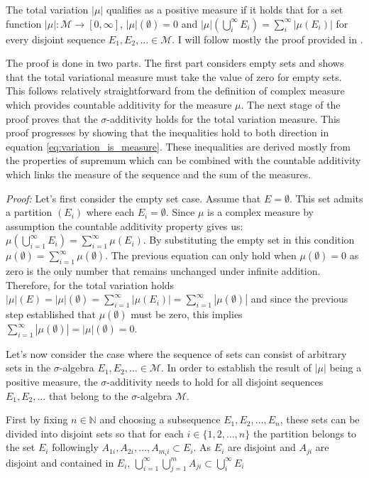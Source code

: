 \documentclass[12pt]{artikel1}
\begin{document}
The total variation $|\mu|$ qualifies as a positive measure if it holds that for a set function $|\mu|:\mathcal{M}\rightarrow[0,\infty]$, $|\mu|(\emptyset)=0$ and $|\mu|\left(\bigcup_i^\infty E_i\right)=\sum_i^\infty|\mu(E_i)|$ for every disjoint sequence $E_1,E_2,\ldots\in\mathcal{M}$. I will follow mostly the proof provided in \autocite{axler_measure_2019}.

The proof is done in two parts. The first part considers empty sets and shows that the total variational measure must take the value of zero for empty sets. This follows relatively straightforward from the definition of complex measure which provides countable additivity for the measure $\mu$. The next stage of the proof proves that the $\sigma$-additivity holds for the total variation measure. This proof progresses by showing that the inequalities hold to both direction in equation \ref{eq:variation_is_measure}. These inequalities are derived mostly from the properties of supremum which can be combined with the countable additivity which links the measure of the sequence and the sum of the measures.

\textit{Proof:} Let's first consider the empty set case. Assume that $E=\emptyset$. This set admits a partition $(E_i)$ where each $E_i=\emptyset$. Since $\mu$ is a complex measure by assumption the countable additivity property gives us: $\mu\left(\bigcup_{i=1}^\infty E_i \right)=\sum_{i=1}^\infty\mu(E_i)$. By substituting the empty set in this condition $\mu\left(\emptyset\right)=\sum_{i=1}^\infty\mu(\emptyset)$. The previous equation can only hold when $\mu(\emptyset)=0$ as zero is the only number that remains unchanged under infinite addition. Therefore, for the total variation holds $|\mu|(E)=|\mu|(\emptyset)=\sum_{i=1}^\infty|\mu(E_i)|=\sum_{i=1}^\infty|\mu(\emptyset)|$ and since the previous step established that $\mu(\emptyset)$ must be zero, this implies $\sum_{i=1}^\infty|\mu(\emptyset)|=|\mu|(\emptyset)=0$.

Let's now consider the case where the sequence of sets can consist of arbitrary sets in the $\sigma$-algebra $E_1,E_2,\ldots\in\mathcal{M}$. In order to establish the result of $|\mu|$ being a positive measure, the $\sigma$-additivity needs to hold for all disjoint sequences $E_1,E_2,\ldots$ that belong to the $\sigma$-algebra $\mathcal{M}$. 

First by fixing $n\in\mathbb{N}$ and choosing a subsequence $E_1,E_2,\ldots,E_n$, these sets can be divided into disjoint sets so that for each $i\in\{1,2,\ldots,n\}$ the partition belongs to the set $E_i$ followingly $A_{1i},A_{2i},\ldots,A_{m_ii}\subset E_i$. As $E_i$ are disjoint and $A_{ji}$ are disjoint and contained in $E_i$, $\bigcup_{i=1}^\infty\bigcup_{j=1}^m A_{ji}\subset\bigcup_i^\infty E_i$
\end{document}
